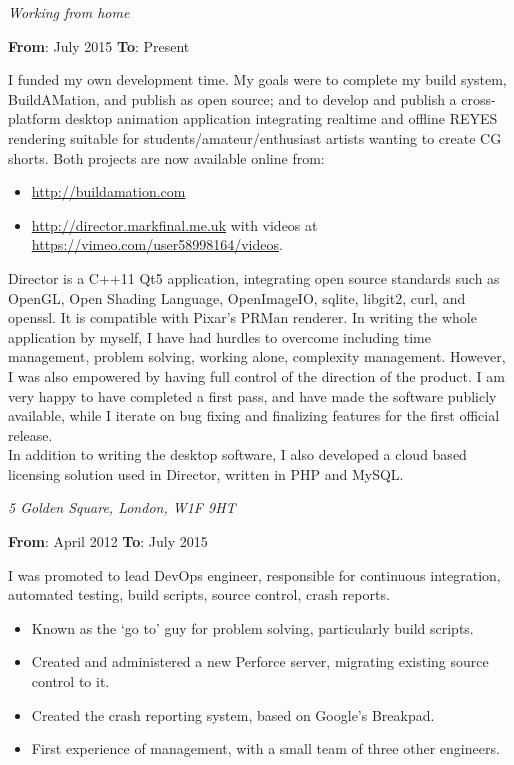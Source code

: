 \documentclass[a4paper,12pt]{article}
\newcommand{\cvheading}[1]{{\medskip\noindent\hspace{-5mm}{\sc #1}\par}}
\newcommand{\place}[2]{\vspace*{1ex}{\noindent\bf #1}\hfill{\it #2}\par}
\newcommand{\fromto}[2]{{\bf From}: #1 {\bf To}: #2\par}
\begin{document}
\cvheading{Work Experience}
\place{Entrepreneur}{Working from home}
\fromto{July 2015}{Present}
I funded my own development time. My goals were to complete my build system, BuildAMation, and publish as open source; and to develop and publish a cross-platform desktop animation application integrating realtime and offline REYES rendering suitable for students/amateur/enthusiast artists wanting to create CG shorts. Both projects are now available online from:
\begin{itemize}
\item \href{http://buildamation.com}{http://buildamation.com}
\item \href{http://director.markfinal.me.uk}{http://director.markfinal.me.uk} with videos at \href{https://vimeo.com/user58998164/videos}{https://vimeo.com/user58998164/videos}.
\end{itemize}
Director is a C++11 Qt5 application, integrating open source standards such as OpenGL, Open Shading Language, OpenImageIO, sqlite, libgit2, curl, and openssl. It is compatible with Pixar's PRMan renderer. In writing the whole application by myself, I have had hurdles to overcome including time management, problem solving, working alone, complexity management. However, I was also empowered by having full control of the direction of the product. I am very happy to have completed a first pass, and have made the software publicly available, while I iterate on bug fixing and finalizing features for the first official release.
\\
In addition to writing the desktop software, I also developed a cloud based licensing solution used in Director, written in PHP and MySQL.

\place{The Foundry VisionMongers Ltd}{5 Golden Square, London, W1F 9HT}
\fromto{April 2012}{July 2015}
I was promoted to lead DevOps engineer, responsible for continuous integration, automated testing, build scripts, source control, crash reports.
\begin{itemize}
\item Known as the `go to' guy for problem solving, particularly build scripts.
\item Created and administered a new Perforce server, migrating existing source control to it.
\item Created the crash reporting system, based on Google's Breakpad.
\item First experience of management, with a small team of three other engineers.
\end{itemize}
\end{document}
